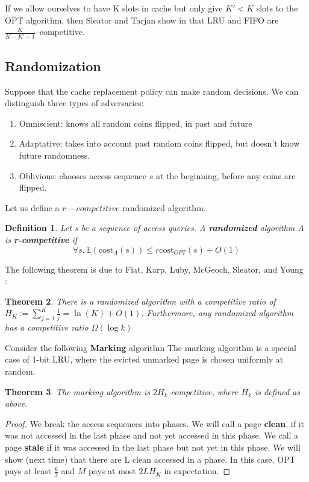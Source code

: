 \documentclass[11pt]{article}
\newtheorem{theorem}{Theorem}
\newtheorem{definition}[theorem]{Definition}
\begin{document}
If we allow ourselves to have K slots in cache but only give $K' < K$ slots to the OPT algorithm, then Sleator and Tarjan show in \cite{SJ85} that LRU and FIFO are $\frac{K}{K - K' +1}$--competitive.

\subsection{Randomization}
Suppose that the cache replacement policy can make random decisions. We can distinguish three types of adversaries:

\begin{enumerate}
\item Omniscient: knows all random coins flipped, in past and future
\item Adaptative: takes into account past random coins flipped, but doesn't know future randomness.
\item Oblivious: chooses access sequence $s$ at the beginning, before any coins are flipped.
\end{enumerate} 

Let us define a $r-competitive$ randomized algorithm.

\begin{definition}
Let s be a sequence of access queries. A {\bf randomized} algorithm A is {\bf r-competitive} if $$\forall s, \mathbb{E}(\text{cost}_A(s)) \leq r \text{cost}_{OPT}(s) + O(1)$$
\end{definition}

The following theorem is due to Fiat, Karp, Luby, McGeoch, Sleator, and Young \cite{FKLMSY91}:

\begin{theorem}
There is a randomized algorithm with a competitive ratio of $H_K := \sum_{j=1}^K \frac{1}{j} = \ln(K) + O(1)$. Furthermore, any randomized algorithm has a competitive ratio $\Omega(\log k)$
\end{theorem}

Consider the following {\bf Marking} algorithm The marking algorithm is a special case of 1-bit LRU, where the evicted unmarked page is chosen uniformly at random.

\begin{theorem}
The marking algorithm is $2 H_k$-competitive, where $H_k$ is defined as above.
\end{theorem}

\begin{proof}
We break the access sequences into phases. We will call a page {\bf clean}, if it was not accessed in the last phase and not yet accessed in this phase. We call a page {\bf stale} if it was accessed in the last phase but not yet in this phase. We will show (next time) that there are L clean accessed in a phase. In this case, OPT pays at least $\frac{k}{2}$ and $M$ pays at most $2 L H_K$ in expectation.
\end{proof}
\end{document}
